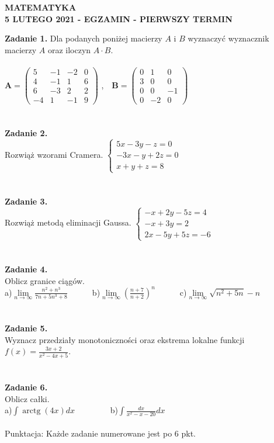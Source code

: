 \documentclass[12pt,a4paper]{report}
\begin{document}
\begin{center}

\textbf{MATEMATYKA \\5 LUTEGO 2021 - EGZAMIN - PIERWSZY TERMIN}

\end{center}\textbf{Zadanie 1.}  Dla podanych poniżej macierzy $A$ i $B$ wyznaczyć wyznacznik macierzy $A$ oraz iloczyn $A\cdot B$. \\\\ $ \mathbf{A} =\left( \begin{array}{cccc}5 & -1& -2 & 0\\4 & -1&1 & 6\\6 & -3& 2 & 2\\-4 & 1 & -1 & 9 \end{array} \right)$ ,\ \ $\mathbf{B} =\left( \begin{array}{ccc}0 & 1& 0\\3 & 0& 0\\0 & 0& -1\\0 & -2& 0\end{array} \right)$\\\\\\\textbf{Zadanie 2.} \\Rozwiąż wzorami Cramera. $\left\{ \begin{array}{ll}5x-3y-z=0\\-3x-y+2z=0\\x+y+z=8\end{array} \right.$\\\\\\\textbf{Zadanie 3.}  \\Rozwiąż metodą eliminacji Gaussa. $\left\{ \begin{array}{ll}-x+2y-5z=4\\-x+3y=2\\2x-5y+5z=-6\end{array} \right.$\\\\\\\textbf{Zadanie 4.} \\Oblicz granice ciągów.\\a)$\lim\limits_{n\to\infty}\frac{n^2+n^3}{7n+5n^3+8}$\ \ \ \ \ \  b)$\lim\limits_{n\to \infty}(\frac{n+7}{n+2})^n$\ \ \ \ \ \ c)$\lim\limits_{n\to\infty} \sqrt{n^2+5n}-n$\\\\\\\textbf{Zadanie 5.} \\Wyznacz przedziały monotoniczności oraz ekstrema lokalne funkcji $f(x)=\frac{3x+2}{x^2-4x+5}$.\\\\\\\textbf{Zadanie 6.} \\Oblicz całki. \\a)$\int \operatorname{arctg}(4x) dx$ \ \ \ \ \ \ \ \ b)$\int \frac{dx}{x^2-x-20} dx$\\\\Punktacja: Każde zadanie numerowane jest po 6 pkt.
\end{document}
